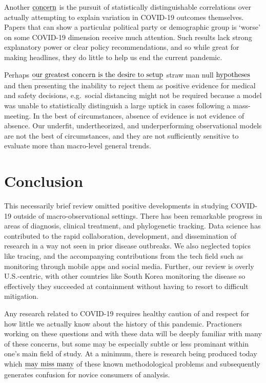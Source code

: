 \documentclass[10pt,letterpaper]{article}
\begin{document}
Another \(\text{\underline{concern}}\) is the pursuit of statistically
distinguishable correlations over actually attempting to explain
variation in COVID-19 outcomes themselves. Papers that can show a
particular political party or demographic group is `worse' on some
COVID-19 dimension receive much attention. Such results lack strong
explanatory power or clear policy recommendations, and so while great
for making headlines, they do little to help us end the current
pandemic.

Perhaps
\(\text{\underline{our greatest concern is the desire to setup}}\) straw
man null \(\text{\underline{hypotheses}}\) and then presenting the
inability to reject them as positive evidence for medical and safety
decisions, e.g.~social distancing might not be required because a model
was unable to statistically distinguish a large uptick in cases
following a mass-meeting. In the best of circumstances, absence of
evidence is not evidence of absence. Our underfit, undertheorized, and
underperforming observational models are not the best of circumstances,
and they are not sufficiently sensitive to evaluate more than
macro-level general trends.

\hypertarget{conclusion}{%
\section{Conclusion}\label{conclusion}}

This necessarily brief review omitted positive developments in studying
COVID-19 outside of macro-observational settings. There has been
remarkable progress in areas of diagnosis, clinical treatment, and
phylogenetic tracking. Data science has contributed to the rapid
collaboration, development, and dissemination of research in a way not
seen in prior disease outbreaks. We also neglected topics like tracing,
and the accompanying contributions from the tech field such as
monitoring through mobile apps and social media. Further, our review is
overly U.S.-centric, with other countries like South Korea monitoring
the disease so effectively they succeeded at containment without having
to resort to difficult mitigation.

Any research related to COVID-19 requires healthy caution of and respect
for how little we actually know about the history of this pandemic.
Practioners working on these questions and with these data will be
deeply familiar with many of these concerns, but some may be especially
subtle or less prominant within one's main field of study. At a minimum,
there is research being produced today which
\(\text{\underline{may miss many}}\) of these known methodological
problems and subsequently generates confusion for novice consumers of
analysis.
\end{document}
